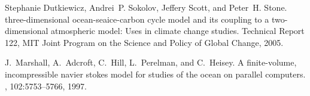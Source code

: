 \begin{thebibliography}{1}

Stephanie Dutkiewicz, Andrei~P. Sokolov, Jeffery Scott, and Peter~H. Stone.
 three-dimensional ocean-seaice-carbon cycle model and its
  coupling to a two-dimensional atmospheric model: {U}ses in climate change
  studies.
\newblock Technical Report 122, MIT Joint Program on the Science and Policy of
  Global Change, 2005.

J.~Marshall, A.~Adcroft, C.~Hill, L.~Perelman, and C.~Heisey.
\newblock A finite-volume, incompressible navier stokes model for studies of
  the ocean on parallel computers.
, 102:5753--5766, 1997.

\end{thebibliography}
